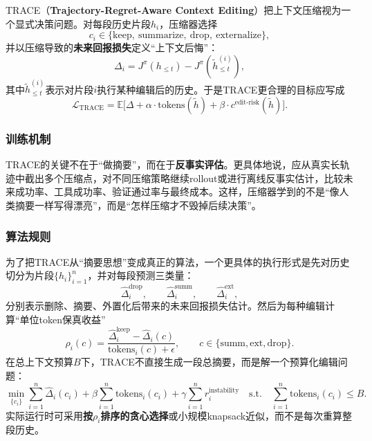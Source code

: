 \documentclass[12pt,a4paper]{article}
\begin{document}
TRACE（\textbf{Trajectory-Regret-Aware Context Editing}）把上下文压缩视为一个显式决策问题。对每段历史片段$h_i$，压缩器选择
\begin{equation}
c_i \in \{\text{keep},\ \text{summarize},\ \text{drop},\ \text{externalize}\},
\end{equation}
并以压缩导致的\textbf{未来回报损失}定义“上下文后悔”：
\begin{equation}
\Delta_i =
J^{\pi}(h_{\le t})
-
J^{\pi}(\tilde{h}^{(i)}_{\le t}),
\end{equation}
其中$\tilde{h}^{(i)}_{\le t}$表示对片段$i$执行某种编辑后的历史。于是TRACE更合理的目标应写成
\begin{equation}
\mathcal{L}_{\text{TRACE}}
=
\mathbb{E}\Big[
\Delta
+ \alpha \cdot \text{tokens}(\tilde{h})
+ \beta \cdot c^{\text{edit-risk}}(\tilde{h})
\Big].
\end{equation}

\subsubsection{训练机制}

TRACE的关键不在于“做摘要”，而在于\textbf{反事实评估}。更具体地说，应从真实长轨迹中截出多个压缩点，对不同压缩策略继续rollout或进行离线反事实估计，比较未来成功率、工具成功率、验证通过率与最终成本。这样，压缩器学到的不是“像人类摘要一样写得漂亮”，而是“怎样压缩才不毁掉后续决策”。

\subsubsection{算法规则}

为了把TRACE从“摘要思想”变成真正的算法，一个更具体的执行形式是先对历史切分为片段$\{h_i\}_{i=1}^n$，并对每段预测三类量：
\begin{equation}
\hat{\Delta}_i^{\text{drop}},\qquad
\hat{\Delta}_i^{\text{summ}},\qquad
\hat{\Delta}_i^{\text{ext}},
\end{equation}
分别表示删除、摘要、外置化后带来的未来回报损失估计。然后为每种编辑计算“单位token保真收益”
\begin{equation}
\rho_i(c)
=
\frac{\hat{\Delta}_i^{\text{keep}}-\hat{\Delta}_i(c)}{\text{tokens}_i(c)+\epsilon},
\qquad
c\in\{\text{summ},\text{ext},\text{drop}\}.
\end{equation}
在总上下文预算$B$下，TRACE不直接生成一段总摘要，而是解一个预算化编辑问题：
\begin{equation}
\min_{\{c_i\}}
\sum_{i=1}^n \hat{\Delta}_i(c_i)
+ \beta \sum_{i=1}^n \text{tokens}_i(c_i)
+ \gamma \sum_{i=1}^n r_i^{\text{instability}}
\quad
\text{s.t.}\quad
\sum_{i=1}^n \text{tokens}_i(c_i)\le B.
\end{equation}
实际运行时可采用\textbf{按$\rho_i$排序的贪心选择}或小规模knapsack近似，而不是每次重算整段历史。
\end{document}
